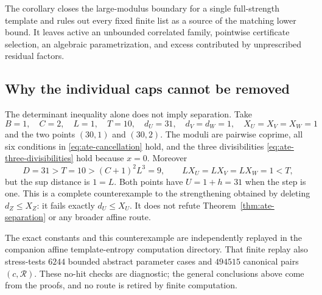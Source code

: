 The corollary closes the large-modulus boundary for a single full-strength
template and rules out every fixed finite list as a source of the matching
lower bound.  It leaves active an unbounded correlated family, pointwise
certificate selection, an algebraic parametrization, and excess contributed
by unprescribed residual factors.

\subsection{Why the individual caps cannot be removed}

The determinant inequality alone does not imply separation.  Take
\[
 B=1,\quad C=2,\quad L=1,\quad T=10,\quad
 d_U=31,\quad d_V=d_W=1,\quad X_U=X_V=X_W=1
\]
and the two points $(30,1)$ and $(30,2)$.  The moduli are pairwise coprime,
all six conditions in \eqref{eq:ate-cancellation} hold, and the three
divisibilities \eqref{eq:ate-three-divisibilities} hold because $x=0$.
Moreover
\[
 D=31>T=10>(C+1)^2L^3=9,
 \qquad LX_U=LX_V=LX_W=1<T,
\]
but the sup distance is $1=L$.  Both points have $U=1+h=31$ when the step
is one.  This is a complete counterexample to the strengthening obtained by
deleting $d_Z\le X_Z$: it fails exactly $d_U\le X_U$.  It does not refute
Theorem~\ref{thm:ate-separation} or any broader affine route.

The exact constants and this counterexample are independently replayed in
the companion affine template-entropy computation directory.  That finite
replay also stress-tests $6244$ bounded abstract parameter cases and
$494515$ canonical pairs $(c,\mathcal R)$.  These no-hit checks are
diagnostic; the general conclusions above come from the proofs, and no
route is retired by finite computation.
